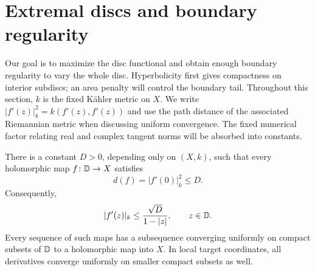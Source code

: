 \section{Extremal discs and boundary regularity}
\label{sec:extremal-discs}

Our goal is to maximize the disc functional and obtain enough boundary
regularity to vary the whole disc. Hyperbolicity first gives compactness
on interior subdiscs; an area penalty will control the boundary tail.
Throughout this section, $k$ is the fixed K\"ahler metric on $X$.
We write $|f'(z)|_k^2=k(f'(z),f'(z))$ and use the path distance of
the associated Riemannian metric when discussing uniform convergence.
The fixed numerical factor relating real and complex tangent norms will
be absorbed into constants.

\begin{lemma}
\label{ex:brody}
There is a constant $D>0$, depending only on $(X,k)$, such that every
holomorphic map $f\colon\mathbb D\to X$ satisfies
\[
 d(f)=|f'(0)|_k^2\leq D.
\]
Consequently,
\begin{equation}
 |f'(z)|_k\leq\frac{\sqrt D}{1-|z|},\qquad z\in\mathbb D.
 \label{eq:brody-derivative}
\end{equation}
Every sequence of such maps has a subsequence converging uniformly on
compact subsets of $\mathbb D$ to a holomorphic map into $X$. In local target
coordinates, all derivatives converge uniformly on smaller compact
subsets as well.
\end{lemma}

